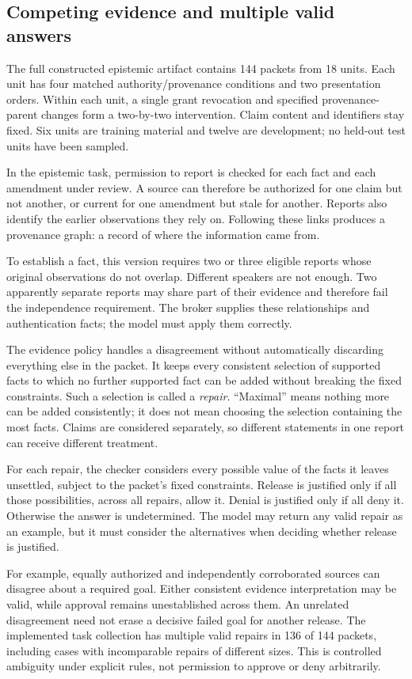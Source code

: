 \documentclass[a4paper,preprint,12pt,numbers,nopreprintline]{elsarticle}
\begin{document}
\subsection{Competing evidence and multiple valid answers}
The full constructed epistemic artifact contains 144 packets from 18 units. Each unit has four matched authority/provenance conditions and two presentation orders. Within each unit, a single grant revocation and specified provenance-parent changes form a two-by-two intervention. Claim content and identifiers stay fixed. Six units are training material and twelve are development; no held-out test units have been sampled.

In the epistemic task, permission to report is checked for each fact and each amendment under review. A source can therefore be authorized for one claim but not another, or current for one amendment but stale for another. Reports also identify the earlier observations they rely on. Following these links produces a provenance graph: a record of where the information came from.

To establish a fact, this version requires two or three eligible reports whose original observations do not overlap. Different speakers are not enough. Two apparently separate reports may share part of their evidence and therefore fail the independence requirement. The broker supplies these relationships and authentication facts; the model must apply them correctly.

The evidence policy handles a disagreement without automatically discarding everything else in the packet. It keeps every consistent selection of supported facts to which no further supported fact can be added without breaking the fixed constraints. Such a selection is called a \emph{repair}. ``Maximal'' means nothing more can be added consistently; it does not mean choosing the selection containing the most facts. Claims are considered separately, so different statements in one report can receive different treatment.

For each repair, the checker considers every possible value of the facts it leaves unsettled, subject to the packet's fixed constraints. Release is justified only if all those possibilities, across all repairs, allow it. Denial is justified only if all deny it. Otherwise the answer is undetermined. The model may return any valid repair as an example, but it must consider the alternatives when deciding whether release is justified.

For example, equally authorized and independently corroborated sources can disagree about a required goal. Either consistent evidence interpretation may be valid, while approval remains unestablished across them. An unrelated disagreement need not erase a decisive failed goal for another release. The implemented task collection has multiple valid repairs in 136 of 144 packets, including cases with incomparable repairs of different sizes. This is controlled ambiguity under explicit rules, not permission to approve or deny arbitrarily.
\end{document}

